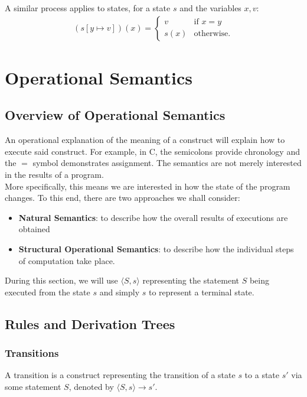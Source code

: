 \documentclass[a4paper, 12pt, twoside]{article}
\begin{document}
A similar process applies to states, for a state $s$ and the variables
$x, v$: \begin{gather*}
  (s[y\mapsto v])(x) = \begin{cases}
    v & \text{if } x = y \\
    s(x) & \text{otherwise}.
  \end{cases}
\end{gather*}

\newpage

\section{Operational Semantics}

\subsection{Overview of Operational Semantics}

An operational explanation of the meaning of a construct will explain
how to execute said construct. For example, in C, the semicolons provide
chronology and the $=$ symbol demonstrates assignment. The semantics
are not merely interested in the results of a program.
\\[\baselineskip]
More specifically, this means we are interested in how the state of the
program changes. To this end, there are two approaches we shall consider:
\begin{itemize}
  \item \textbf{Natural Semantics}: to describe how the overall
  results of executions are obtained
  \item \textbf{Structural Operational Semantics}: to describe how
  the individual steps of computation take place.
\end{itemize} During this section, we will use $\langle S, s\rangle$
representing the statement $S$ being executed from the state $s$ and
simply $s$ to represent a terminal state.

\subsection{Rules and Derivation Trees}

\subsubsection{Transitions}

A transition is a construct representing the transition of
a state $s$ to a state $s'$ via some statement $S$, denoted
by $\langle S, s \rangle \to s'$.
\end{document}

